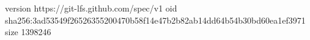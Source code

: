 version https://git-lfs.github.com/spec/v1
oid sha256:3ad53549f26526355200470b58f14e47b2b82ab14dd64b54b30bd60ea1ef3971
size 1398246

